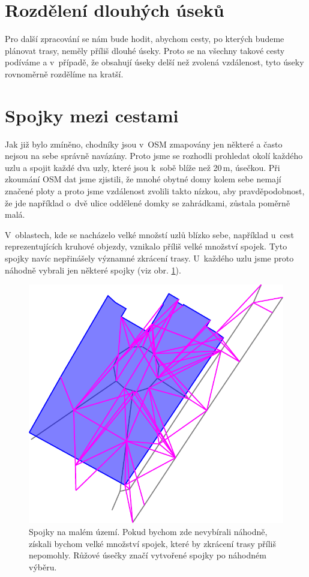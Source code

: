 \section{Rozdělení dlouhých úseků}
Pro další zpracování se nám bude hodit, abychom cesty, po kterých budeme
plánovat trasy, neměly příliš dlouhé úseky. Proto se na všechny takové cesty
podíváme a v~případě, že obsahují úseky delší než zvolená vzdálenost, tyto úseky
rovnoměrně rozdělíme na kratší. 

\section{Spojky mezi cestami}
Jak již bylo zmíněno, chodníky jsou v~OSM zmapovány jen některé a často nejsou
na sebe správně navázány. Proto jsme se rozhodli prohledat okolí každého uzlu a
spojit každé dva uzly, které jsou k~sobě blíže než 20\,m, úsečkou. Při zkoumání
OSM dat jsme zjistili, že mnohé obytné domy kolem sebe nemají značené ploty a
proto jsme vzdálenost zvolili takto nízkou, aby pravděpodobnost, že
jde například o~dvě ulice oddělené domky se zahrádkami, zůstala poměrně malá.  

V~oblastech, kde se nacházelo velké množstí uzlů blízko sebe, například u~cest
reprezentujících kruhové objezdy, vznikalo příliš velké množství spojek. Tyto
spojky navíc nepřinášely významné zkrácení trasy. U~každého uzlu jsme proto
náhodně vybrali jen některé spojky (viz obr. \ref{fig:spojky}).

\begin{figure}[h]
	\centering
	\includegraphics{../img/spojky.pdf}
	\caption{Spojky na malém území. Pokud bychom zde nevybírali náhodně, získali
	bychom velké množství spojek, které by zkrácení trasy příliš nepomohly.
	Růžové úsečky značí vytvořené spojky po náhodném výběru.}
	\label{fig:spojky}
\end{figure}


